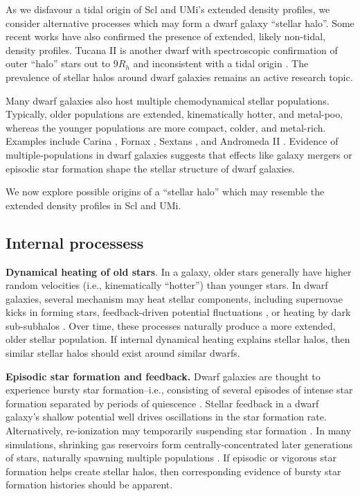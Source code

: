 As we disfavour a tidal origin of Scl and UMi's extended density
profiles, we consider alternative processes which may form a dwarf
galaxy ``stellar halo''. Some recent works have also confirmed the
presence of extended, likely non-tidal, density profiles. Tucana II is
another dwarf with spectroscopic confirmation of outer ``halo'' stars
out to \(9R_h\) and inconsistent with a tidal origin
\citep{chiti+2021, chiti+2023}. The prevalence of stellar halos around
dwarf galaxies remains an active research topic.

Many dwarf galaxies also host multiple chemodynamical stellar
populations. Typically, older populations are extended, kinematically
hotter, and metal-poo, whereas the younger populations are more compact,
colder, and metal-rich. Examples include Carina
\citep[\citet{fabrizio+2016}, \citet{kordopatis+2016}]{battaglia+2012},
Fornax \citep[\citet{amorisco+evans2012},
\citet{delpino+aparicio+hidalgo2015}]{battaglia+2006}, Sextans
\citep{battaglia+2011, cicuendez+battaglia2018, roederer+2023}, and
Andromeda II
\citep{mcconnachie+arimoto+irwin2007, ho+2012, delpino+2017}. Evidence
of multiple-populations in dwarf galaxies suggests that effects like
galaxy mergers or episodic star formation shape the stellar structure of
dwarf galaxies.

We now explore possible origins of a ``stellar halo'' which may resemble
the extended density profiles in Scl and UMi.

\subsection{Internal processess}\label{internal-processess}

\textbf{Dynamical heating of old stars}. In a galaxy, older stars
generally have higher random velocities (i.e., kinematically ``hotter'')
than younger stars. In dwarf galaxies, several mechanism may heat
stellar components, including supernovae kicks in forming stars,
feedback-driven potential fluctuations
\citep{stinson+2009, maxwell+2012, el-badry+2016, mercado+2021}, or
heating by dark sub-subhalos \citep{penarrubia+2025}. Over time, these
processes naturally produce a more extended, older stellar population.
If internal dynamical heating explains stellar halos, then similar
stellar halos should exist around similar dwarfs.

\textbf{Episodic star formation and feedback.} Dwarf galaxies are
thought to experience bursty star formation--i.e., consisting of several
episodes of intense star formation separated by periods of quiescence
\citep[e.g.,][]{salvadori+ferrara+schneider2008, valcke+derijcke+dejonghe2008, wheeler+2019, azartash-namin+2024}.
Stellar feedback in a dwarf galaxy's shallow potential well drives
oscillations in the star formation rate. Alternatively, re-ionization
may temporarily suspending star formation \citep{benitez-llambay+2015}.
In many simulations, shrinking gas reservoirs form
centrally-concentrated later generations of stars, naturally spawning
multiple populations \citep{kawata+2006, revaz+jablonka2018}. If
episodic or vigorous star formation helps create stellar halos, then
corresponding evidence of bursty star formation histories should be
apparent.

